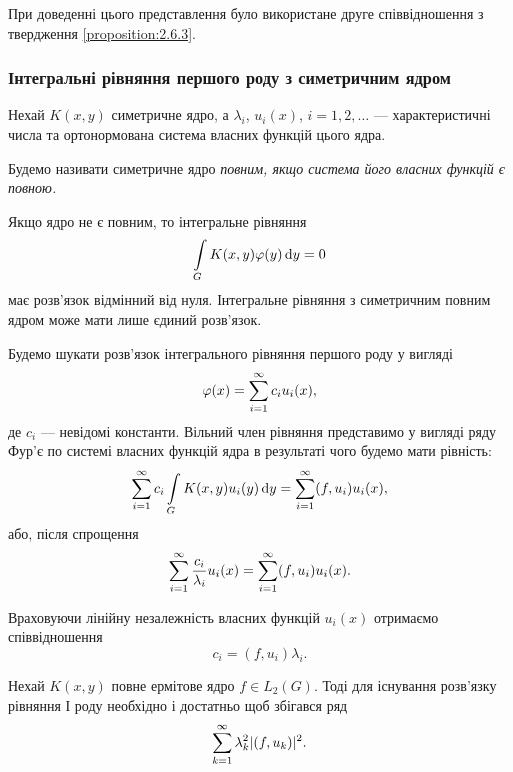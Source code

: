 \begin{remark}
	При доведенні цього представлення було використане друге співвідношення з твердження \ref{proposition:2.6.3}.
\end{remark}

\subsubsection{Інтегральні рівняння першого роду з симетричним ядром}

Нехай $K(x, y)$ симетричне ядро, а $\lambda_i$, $u_i(x)$, $i=1,2,\ldots$ --- характеристичні числа та ортонормована система власних функцій цього ядра.

\begin{definition}
	Будемо називати симетричне ядро \it{повним}, якщо система його власних функцій є повною.
\end{definition}

Якщо ядро не є повним, то інтегральне рівняння
\begin{equation}
    \displaystyle\int\limits_G K(x,y)\varphi(y)\mathop{}\!\mathrm{d} y=0
\end{equation}
має розв'язок відмінний від нуля. Інтегральне рівняння з симетричним повним ядром може мати лише єдиний розв'язок. \medskip

Будемо шукати розв'язок інтегрального рівняння першого роду у вигляді
\begin{equation}
	\varphi(x) = \displaystyle\sum\limits_{i=1}^\infty c_i u_i(x),
\end{equation}
де $c_i$ --- невідомі константи. Вільний член рівняння представимо у вигляді ряду Фур'є по системі власних функцій ядра в результаті чого будемо мати рівність:
\begin{equation}
	\displaystyle\sum\limits_{i=1}^\infty c_i \displaystyle\int\limits_G K(x,y) u_i(y) \mathop{}\!\mathrm{d} y = \displaystyle\sum\limits_{i=1}^\infty (f,u_i)u_i(x),
\end{equation}
або, після спрощення
\begin{equation}
	\displaystyle\sum\limits_{i=1}^\infty \dfrac{c_i}{\lambda_i} u_i(x) = \displaystyle\sum\limits_{i=1}^\infty (f,u_i)u_i(x).
\end{equation}

Враховуючи лінійну незалежність власних функцій $u_i(x)$ отримаємо співвідношення 
\begin{equation}
	c_i = (f, u_i) \lambda_i.
\end{equation}

\begin{theorem} 
	Нехай $K(x, y)$ повне ермітове ядро $f \in L_2(G)$. Тоді для існування розв'язку рівняння І роду необхідно і достатньо щоб збігався ряд
	\begin{equation}
		\displaystyle\sum\limits_{k=1}^\infty \lambda_k^2 |(f, u_k)|^2.
	\end{equation}
\end{theorem}

